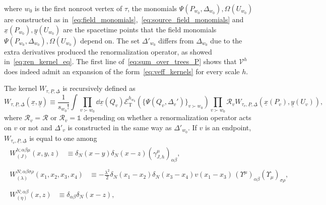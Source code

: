 \documentclass[a4paper, 11pt]{article}
\newcommand{\id}{\mathds{1}}								%
\newcommand{\sing}[2]{{#1}^{#2}}							%
\newcommand{\kren}{\mathscr{R}}								%
\newcommand{\TExp}[1]{\mathcal{E}^{#1}_%
{\scriptscriptstyle{\mathrm{T}}}}							%
\newcommand{\Src}{\Omega}
\theoremstyle{thm}
\begin{document}
where $w_0$ is the first nonroot vertex of $\tau$, the monomials $\Psi(P_{w_0}, \Delta_{w_0}), \Src(U_{w_0})$ are constructed as in~\eqref{eq:field_monomials},~\eqref{eq:source_field_monomials} and $\underline{x}(P_{w_0}), \underline{y}(U_{w_0})$ are the spacetime points that the field monomials $\Psi(P_{w_0}, \Delta_{w_0}), \Src(U_{w_0})$ depend on. The set $\Delta'_{w_0}$ differs from $\Delta_{w_0}$ due to the extra derivatives produced the renormalization operator, as showed in~\eqref{eq:ren_kernel_eq}. The first line of~\eqref{eq:sum_over_trees_P} shows that $\sing{\mathscr{V}}{h}$ does indeed admit an expansion of the form~\eqref{eq:veff_kernels} for every scale $h$.

The kernel $W_{\tau, \underline{P}, \underline{\Delta}}$ is recursively defined as
\begin{equation}
\label{eq:W_tau_recursive}
W_{\tau, \underline{P}, \underline{\Delta}}(\underline{x}, \underline{y}) \equiv \frac{1}{s_{w_0}!} \! \int \! \prod_{v \succ w_0} \!\! \dd{\underline{x}(Q_v)} \TExp{h_{w_0}}(\lbrace \Psi(Q_v, \Delta_v') \rbrace_{v \succ w_0}) \! \prod_{v \succ w_0} \!\! \kren_v W_{\tau_v, \underline{P}, \underline{\Delta}}(\underline{x}(P_v), \underline{y}(U_v)),
\end{equation}
where $\kren_v = \kren$ or $\kren_v = \id$ depending on whether a renormalization operator acts on $v$ or not and $\Delta'_v$ is constructed in the same way as $\Delta'_{w_0}$. If $v$ is an endpoint, $W_{\tau_v, \underline{P}, \underline{\Delta}}$ is equal to one among
\begin{subequations}
\begin{align}
\begin{split}
\label{eq:J_endpoints}
\sing{W}{h; \alpha \beta \mu}_{(J)}(x, y, z) & \equiv \delta_N(x - y) \delta_N(x - z) (\gamma^\mu_{J,h})_{\alpha \beta},
\end{split} \\
\begin{split}
\label{eq:lambda_endpoints}
\sing{W}{N; \alpha \beta \sigma \rho}_{(\lambda)}(x_1, x_2, x_3, x_4) & \equiv - \frac{\lambda^2}{2} \delta_N(x_1  - x_2) \delta_N(x_3 - x_4) v(x_1 - x_3) \, (\Upsilon^\mu)_{\alpha \beta} (\Upsilon_\mu)_{\sigma \rho},
\end{split} \\
\begin{split}
\label{eq:eta_endpoints}
\sing{W}{N; \alpha \beta}_{(\eta)}(x, z) & \equiv \delta_{\alpha \beta} \delta_N(x - z),
\end{split}
\end{align}
\end{subequations}
\end{document}
